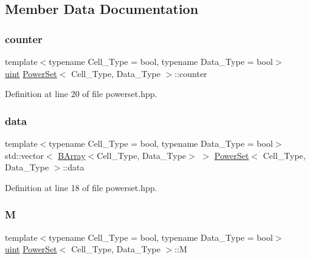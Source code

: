 \subsection{Member Data Documentation}
\mbox{\label{class_power_set_a4c6f00df0ab8cfce977635958c6e1b46}} 
\subsubsection{\texorpdfstring{counter}{counter}}
{\footnotesize\ttfamily template$<$typename Cell\+\_\+\+Type  = bool, typename Data\+\_\+\+Type  = bool$>$ \\
\hyperlink{typedefs_8hpp_a91ad9478d81a7aaf2593e8d9c3d06a14}{uint} \hyperlink{class_power_set}{Power\+Set}$<$ Cell\+\_\+\+Type, Data\+\_\+\+Type $>$\+::counter}



Definition at line 20 of file powerset.\+hpp.

\mbox{\label{class_power_set_abd362b10cfda594de272cfa5dd5db0ee}} 
\subsubsection{\texorpdfstring{data}{data}}
{\footnotesize\ttfamily template$<$typename Cell\+\_\+\+Type  = bool, typename Data\+\_\+\+Type  = bool$>$ \\
std\+::vector$<$ \hyperlink{class_b_array}{B\+Array}$<$Cell\+\_\+\+Type, Data\+\_\+\+Type$>$ $>$ \hyperlink{class_power_set}{Power\+Set}$<$ Cell\+\_\+\+Type, Data\+\_\+\+Type $>$\+::data}



Definition at line 18 of file powerset.\+hpp.

\mbox{\label{class_power_set_a03cb2e123a85cc761375835fc59cab3a}} 
\subsubsection{\texorpdfstring{M}{M}}
{\footnotesize\ttfamily template$<$typename Cell\+\_\+\+Type  = bool, typename Data\+\_\+\+Type  = bool$>$ \\
\hyperlink{typedefs_8hpp_a91ad9478d81a7aaf2593e8d9c3d06a14}{uint} \hyperlink{class_power_set}{Power\+Set}$<$ Cell\+\_\+\+Type, Data\+\_\+\+Type $>$\+::M}



